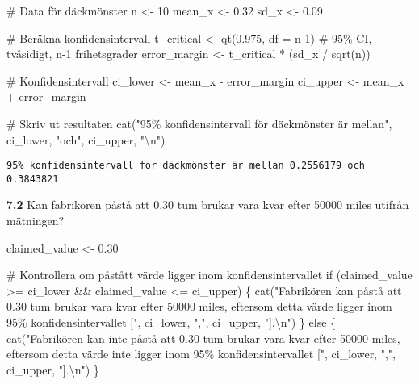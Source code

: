 \documentclass[
  letterpaper,
  DIV=11,
  numbers=noendperiod]{scrartcl}
\newenvironment{Shaded}{\begin{snugshade}}{\end{snugshade}}
\newcommand{\AttributeTok}[1]{\textcolor[rgb]{0.40,0.45,0.13}{#1}}
\newcommand{\CommentTok}[1]{\textcolor[rgb]{0.37,0.37,0.37}{#1}}
\newcommand{\ControlFlowTok}[1]{\textcolor[rgb]{0.00,0.23,0.31}{#1}}
\newcommand{\DecValTok}[1]{\textcolor[rgb]{0.68,0.00,0.00}{#1}}
\newcommand{\FloatTok}[1]{\textcolor[rgb]{0.68,0.00,0.00}{#1}}
\newcommand{\FunctionTok}[1]{\textcolor[rgb]{0.28,0.35,0.67}{#1}}
\newcommand{\NormalTok}[1]{\textcolor[rgb]{0.00,0.23,0.31}{#1}}
\newcommand{\OtherTok}[1]{\textcolor[rgb]{0.00,0.23,0.31}{#1}}
\newcommand{\SpecialCharTok}[1]{\textcolor[rgb]{0.37,0.37,0.37}{#1}}
\newcommand{\StringTok}[1]{\textcolor[rgb]{0.13,0.47,0.30}{#1}}
\begin{document}
\begin{Shaded}
\begin{Highlighting}[]
\CommentTok{\# Data för däckmönster}
\NormalTok{n }\OtherTok{\textless{}{-}} \DecValTok{10}
\NormalTok{mean\_x }\OtherTok{\textless{}{-}} \FloatTok{0.32}
\NormalTok{sd\_x }\OtherTok{\textless{}{-}} \FloatTok{0.09}

\CommentTok{\# Beräkna konfidensintervall}
\NormalTok{t\_critical }\OtherTok{\textless{}{-}} \FunctionTok{qt}\NormalTok{(}\FloatTok{0.975}\NormalTok{, }\AttributeTok{df =}\NormalTok{ n}\DecValTok{{-}1}\NormalTok{) }\CommentTok{\# 95\% CI, tvåsidigt, n{-}1 frihetsgrader}
\NormalTok{error\_margin }\OtherTok{\textless{}{-}}\NormalTok{ t\_critical }\SpecialCharTok{*}\NormalTok{ (sd\_x }\SpecialCharTok{/} \FunctionTok{sqrt}\NormalTok{(n))}

\CommentTok{\# Konfidensintervall}
\NormalTok{ci\_lower }\OtherTok{\textless{}{-}}\NormalTok{ mean\_x }\SpecialCharTok{{-}}\NormalTok{ error\_margin}
\NormalTok{ci\_upper }\OtherTok{\textless{}{-}}\NormalTok{ mean\_x }\SpecialCharTok{+}\NormalTok{ error\_margin}

\CommentTok{\# Skriv ut resultaten}
\FunctionTok{cat}\NormalTok{(}\StringTok{"95\% konfidensintervall för däckmönster är mellan"}\NormalTok{, ci\_lower, }\StringTok{"och"}\NormalTok{, ci\_upper, }\StringTok{"}\SpecialCharTok{\textbackslash{}n}\StringTok{"}\NormalTok{)}
\end{Highlighting}
\end{Shaded}

\begin{verbatim}
95% konfidensintervall för däckmönster är mellan 0.2556179 och 0.3843821 
\end{verbatim}

\textbf{7.2} Kan fabrikören påstå att 0.30 tum brukar vara kvar efter
50000 miles utifrån mätningen?

\begin{Shaded}
\begin{Highlighting}[]
\NormalTok{claimed\_value }\OtherTok{\textless{}{-}} \FloatTok{0.30}

\CommentTok{\# Kontrollera om påstått värde ligger inom konfidensintervallet}
\ControlFlowTok{if}\NormalTok{ (claimed\_value }\SpecialCharTok{\textgreater{}=}\NormalTok{ ci\_lower }\SpecialCharTok{\&\&}\NormalTok{ claimed\_value }\SpecialCharTok{\textless{}=}\NormalTok{ ci\_upper) \{}
  \FunctionTok{cat}\NormalTok{(}\StringTok{"Fabrikören kan påstå att 0.30 tum brukar vara kvar efter 50000 miles,}
\StringTok{  eftersom detta värde ligger inom 95\% konfidensintervallet ["}\NormalTok{, ci\_lower, }\StringTok{","}\NormalTok{, ci\_upper, }\StringTok{"].}\SpecialCharTok{\textbackslash{}n}\StringTok{"}\NormalTok{)}
\NormalTok{\} }\ControlFlowTok{else}\NormalTok{ \{}
  \FunctionTok{cat}\NormalTok{(}\StringTok{"Fabrikören kan inte påstå att 0.30 tum brukar vara kvar efter 50000 miles,}
\StringTok{  eftersom detta värde inte ligger inom 95\% konfidensintervallet ["}\NormalTok{, ci\_lower, }\StringTok{","}\NormalTok{, ci\_upper, }\StringTok{"].}\SpecialCharTok{\textbackslash{}n}\StringTok{"}\NormalTok{)}
\NormalTok{\}}
\end{Highlighting}
\end{Shaded}
\end{document}
